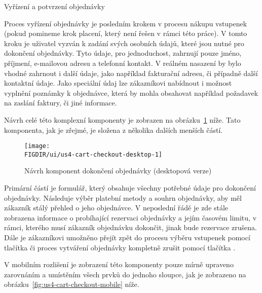 \begin{subsection}{Vyřízení a potvrzení objednávky}
    \label{subsec:narvh-ui-transformace-uzivatelskych-pribehu-vyrideni-a-potvrzeni-objednavky}
    \userstorycheckout

    Proces vyřízení objednávky je posledním krokem v procesu nákupu vstupenek (pokud pomineme krok placení, který není řešen v rámci této práce).
    V tomto kroku je uživatel vyzván k zadání svých osobních údajů, které jsou nutné pro dokončení objednávky.
    Tyto údaje, pro jednoduchost, zahrnují pouze jméno, příjmení, e-mailovou adresu a telefonní kontakt.
    V reálném nasazení by bylo vhodné zahrnout i další údaje, jako například fakturační adresu, či případně další kontaktní údaje.
    Jako speciální údaj lze zákazníkovi nabídnout i možnost vyplnění poznámky k objednávce, která by mohla obsahovat například požadavek na zaslání faktury, či jiné informace.

    Návrh celé této komplexní komponenty je zobrazen na obrázku~\ref{fig:us4-cart-checkout-desktop} níže.
    Tato komponenta, jak je zřejmé, je složena z několika dalších menších částí.

    \begin{figure}[H]
        \centering
        \caption{Návrh komponent dokončení objednávky (desktopová verze)}
        \texttt{[image: \\FIGDIR/ui/us4-cart-checkout-desktop-1]}
        \source{}
        \label{fig:us4-cart-checkout-desktop}
    \end{figure}

    Primární částí je formulář, který obsahuje všechny potřebné údaje pro dokončení objednávky.
    Následuje výběr platební metody a souhrn objednávky, aby měl zákazník stálý přehled o jeho objednávce.
    V neposlední řádě je zde stále zobrazena informace o probíhající rezervaci objednávky a jejím časovém limitu, v rámci, kterého musí zákazník objednávku dokončit, jinak bude rezervace zrušena.
    Dále je zákazníkovi umožněno přejít zpět do procesu výběru vstupenek pomocí tlačítka  či proces vytváření objednávky kompletně zrušit pomocí tlačítka .

    V mobilním rozlišení je zobrazení této komponenty pouze mírně upraveno zarovnáním a umístěním všech prvků do jednoho sloupce, jak je zobrazeno na obrázku~\ref{fig:us4-cart-checkout-mobile} níže.


\end{subsection}
